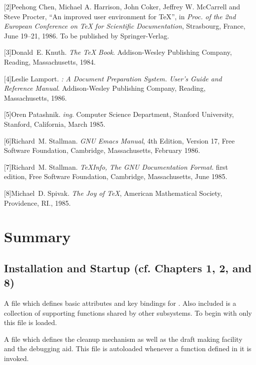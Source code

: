 \item{[2]}{Peehong Chen,  Michael A. Harrison, John Coker, Jeffrey W. McCarrell
and Steve Procter, ``An improved user environment for {\TeX}'', in 
{\it Proc. of the 2nd European Conference on {\TeX} for Scientific
Documentation}, Strasbourg, France, June 19--21, 1986.  To be published
by Springer-Verlag}.

\item{[3]}{Donald~E. Knuth. {\it The {\TeX} Book}.
Addison-Wesley Publishing Company, Reading, Massachusetts, 1984.}

\item{[4]}{Leslie Lamport. {\it {\Lit}: A Document Preparation System. 
User's Guide and Reference Manual}.
Addison-Wesley Publishing Company, Reading, Massachusetts, 1986.}

\item{[5]}{Oren Patashnik. {\it {\Bit}ing}.
Computer Science Department, Stanford University, Stanford,
California, March 1985.}

\item{[6]}{Richard~M. Stallman. {\it {GNU} Emacs Manual}, 4th Edition, 
Version 17, Free Software Foundation, Cambridge, Massachusetts, February 1986.}

\item{[7]}{Richard~M. Stallman. {\it {\TeX}Info, The GNU Documentation Format}.
first edition, Free Software Foundation, Cambridge, Massachusetts, June 1985.}

\item{[8]}{Michael~D. Spivak. {\it The Joy of {\TeX}}, American Mathematical
Society, Providence, RI., 1985.}


\chapter{Summary}

\section{Installation and Startup (cf. Chapters 1, 2, and 8)}

A {\BM} file which defines basic attributes and key bindings for {\BM}.
Also included is a collection of supporting functions shared by other 
subsystems.  To begin with only this file is loaded.

A {\BM} file which defines the cleanup mechanism as well as the draft
making facility and the debugging aid.
This file is autoloaded whenever a function defined in it is invoked.


